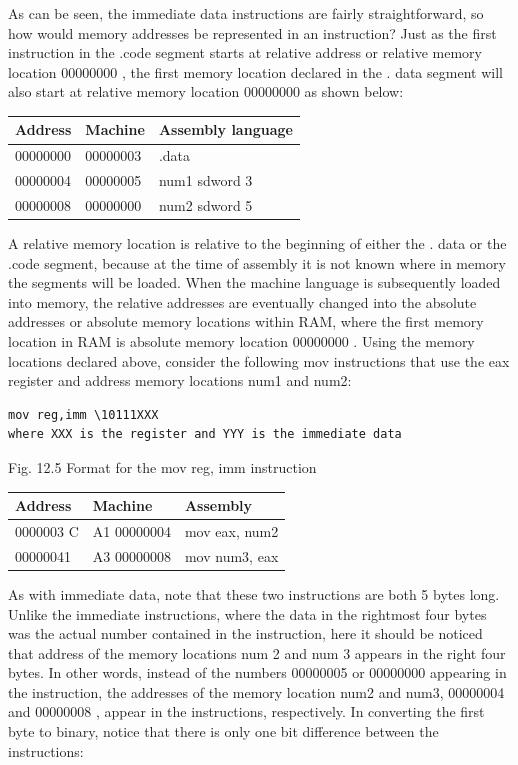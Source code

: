 \documentclass[10pt]{book}
\begin{document}
As can be seen, the immediate data instructions are fairly straightforward, so how would memory addresses be represented in an instruction? Just as the first instruction in the .code segment starts at relative address or relative memory location 00000000 , the first memory location declared in the . data segment will also start at relative memory location 00000000 as shown below:

\begin{center}
\begin{tabular}{|l|l|l|}
\hline
Address & Machine & Assembly language \\
\hline\hline
00000000 & 00000003 & .data \\
\hline
00000004 & 00000005 & num1 sdword 3 \\
\hline
00000008 & 00000000 & num2 sdword 5 \\
\hline
\end{tabular}
\end{center}

A relative memory location is relative to the beginning of either the . data or the .code segment, because at the time of assembly it is not known where in memory the segments will be loaded. When the machine language is subsequently loaded into memory, the relative addresses are eventually changed into the absolute addresses or absolute memory locations within RAM, where the first memory location in RAM is absolute memory location 00000000 . Using the memory locations declared above, consider the following mov instructions that use the eax register and address memory locations num1 and num2:

\begin{verbatim}
mov reg,imm \10111XXX 
where XXX is the register and YYY is the immediate data
\end{verbatim}

Fig. 12.5 Format for the mov reg, imm instruction

\begin{center}
\begin{tabular}{|l|l|l|}
\hline
Address & Machine & Assembly \\
\hline
0000003 C & A1 00000004 & mov eax, num2 \\
\hline
00000041 & A3 00000008 & mov num3, eax \\
\hline
\end{tabular}
\end{center}

As with immediate data, note that these two instructions are both 5 bytes long. Unlike the immediate instructions, where the data in the rightmost four bytes was the actual number contained in the instruction, here it should be noticed that address of the memory locations num 2 and num 3 appears in the right four bytes. In other words, instead of the numbers 00000005 or 00000000 appearing in the instruction, the addresses of the memory location num2 and num3, 00000004 and 00000008 , appear in the instructions, respectively. In converting the first byte to binary, notice that there is only one bit difference between the instructions:
\end{document}

